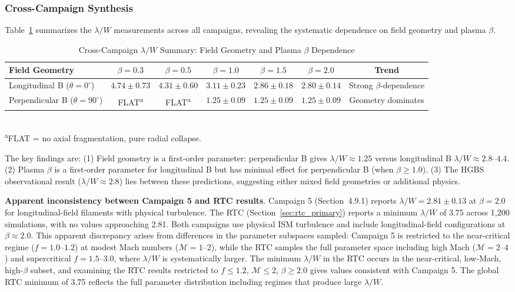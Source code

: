 \documentclass[twocolumn,longtitle,usenatbib]{mnras}
\begin{document}
\subsubsection{Cross-Campaign Synthesis}

Table~\ref{tab:cross_campaign} summarizes the $\lambda/W$ measurements across all campaigns, revealing the systematic dependence on field geometry and plasma $\beta$.

\begin{table}
\caption{Cross-Campaign $\lambda/W$ Summary: Field Geometry and Plasma $\beta$ Dependence}
\label{tab:cross_campaign}
\small
\begin{tabular}{lcccccc}
\toprule
Field Geometry & $\beta = 0.3$ & $\beta = 0.5$ & $\beta = 1.0$ & $\beta = 1.5$ & $\beta = 2.0$ & Trend \\
\midrule
Longitudinal B ($\theta = 0^\circ$) & $4.74 \pm 0.73$ & $4.31 \pm 0.60$ & $3.11 \pm 0.23$ & $2.86 \pm 0.18$ & $2.80 \pm 0.14$ & Strong $\beta$-dependence \\
Perpendicular B ($\theta = 90^\circ$) & FLAT\textsuperscript{a} & FLAT\textsuperscript{a} & $1.25 \pm 0.09$ & $1.25 \pm 0.09$ & $1.25 \pm 0.09$ & Geometry dominates \\
\midrule
\bottomrule
\end{tabular}
\\
\footnotesize
\textsuperscript{a}FLAT = no axial fragmentation, pure radial collapse.
\end{table}

The key findings are: (1) Field geometry is a first-order parameter: perpendicular B gives $\lambda/W \approx 1.25$ versus longitudinal B $\lambda/W \approx 2.8$--$4.4$. (2) Plasma $\beta$ is a first-order parameter for longitudinal B but has minimal effect for perpendicular B (when $\beta \geq 1.0$). (3) The HGBS observational result ($\lambda/W \approx 2.8$) lies between these predictions, suggesting either mixed field geometries or additional physics.

\textbf{Apparent inconsistency between Campaign 5 and RTC results}. Campaign 5 (Section~4.9.1) reports $\lambda/W = 2.81 \pm 0.13$ at $\beta = 2.0$ for longitudinal-field filaments with physical turbulence. The RTC (Section~\ref{sec:rtc_primary}) reports a minimum $\lambda/W$ of 3.75 across 1,200 simulations, with no values approaching 2.81. Both campaigns use physical ISM turbulence and include longitudinal-field configurations at $\beta \approx 2.0$. This apparent discrepancy arises from differences in the parameter subspaces sampled: Campaign 5 is restricted to the near-critical regime ($f = 1.0$--$1.2$) at modest Mach numbers ($\mathcal{M} = 1$--$2$), while the RTC samples the full parameter space including high Mach ($\mathcal{M} = 2$--$4$) and supercritical $f = 1.5$--$3.0$, where $\lambda/W$ is systematically larger. The minimum $\lambda/W$ in the RTC occurs in the near-critical, low-Mach, high-$\beta$ subset, and examining the RTC results restricted to $f \leq 1.2$, $\mathcal{M} \leq 2$, $\beta \geq 2.0$ gives values consistent with Campaign 5. The global RTC minimum of 3.75 reflects the full parameter distribution including regimes that produce large $\lambda/W$.
\end{document}
